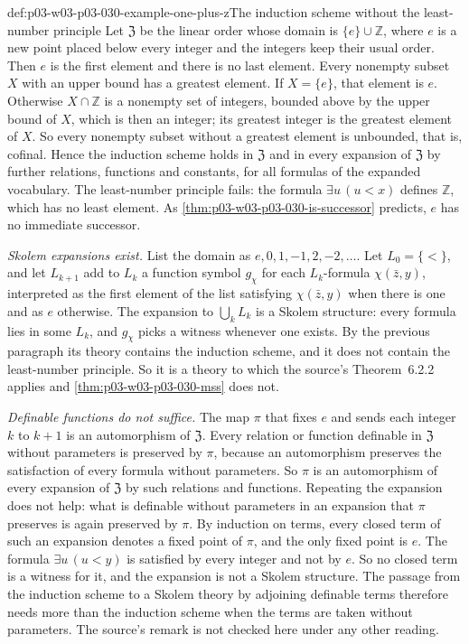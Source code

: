 \begin{hbexample}{def:p03-w03-p03-030-example-one-plus-z}{The induction scheme without the least-number principle}
Let \(\mathfrak Z\) be the linear order whose domain is \(\{e\}\cup\mathbb
Z\), where \(e\) is a new point placed below every integer and the integers
keep their usual order.  Then \(e\) is the first element and there is no last
element.  Every nonempty subset \(X\) with an upper bound has a greatest
element.  If \(X=\{e\}\), that element is \(e\).  Otherwise \(X\cap\mathbb Z\)
is a nonempty set of integers, bounded above by the upper bound of \(X\),
which is then an integer; its greatest integer is the greatest element of
\(X\).  So every nonempty subset without a greatest element is unbounded, that
is, cofinal.  Hence the induction scheme holds in \(\mathfrak Z\) and in every
expansion of \(\mathfrak Z\) by further relations, functions and constants,
for all formulas of the expanded vocabulary.  The least-number principle
fails: the formula \(\exists u\,(u<x)\) defines \(\mathbb Z\), which has no
least element.  As \cref{thm:p03-w03-p03-030-is-successor} predicts, \(e\)
has no immediate successor.

\emph{Skolem expansions exist.}  List the domain as
\(e,0,1,-1,2,-2,\ldots\).  Let \(L_0=\{<\}\), and let \(L_{k+1}\) add to
\(L_k\) a function symbol \(g_\chi\) for each \(L_k\)-formula
\(\chi(\bar z,y)\), interpreted as the first element of the list satisfying
\(\chi(\bar z,y)\) when there is one and as \(e\) otherwise.  The expansion to
\(\bigcup_kL_k\) is a Skolem structure: every formula lies in some \(L_k\),
and \(g_\chi\) picks a witness whenever one exists.  By the previous
paragraph its theory contains the induction scheme, and it does not contain
the least-number principle.  So it is a theory to which the source's
Theorem~6.2.2 applies and \cref{thm:p03-w03-p03-030-mss} does not.

\emph{Definable functions do not suffice.}  The map \(\pi\) that fixes \(e\)
and sends each integer \(k\) to \(k+1\) is an automorphism of
\(\mathfrak Z\).  Every relation or function definable in \(\mathfrak Z\)
without parameters is preserved by \(\pi\), because an automorphism preserves
the satisfaction of every formula without parameters.  So \(\pi\) is an
automorphism of every expansion of \(\mathfrak Z\) by such relations and
functions.  Repeating the expansion does not help: what is definable without
parameters in an expansion that \(\pi\) preserves is again preserved by
\(\pi\).  By induction on terms, every closed term of such an expansion
denotes a fixed point of \(\pi\), and the only fixed point is \(e\).  The
formula \(\exists u\,(u<y)\) is satisfied by every integer and not by
\(e\).  So no closed term is a witness for it, and the expansion is not
a Skolem structure.  The passage from the induction scheme to a Skolem
theory by adjoining definable terms therefore needs more than the induction
scheme when the terms are taken without parameters.  The source's remark is
not checked here under any other reading.
\end{hbexample}


